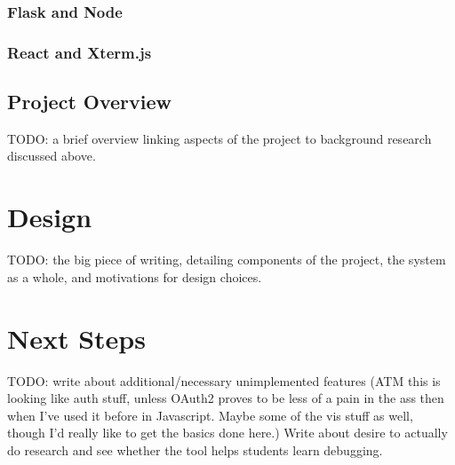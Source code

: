 \documentclass[12pt]{article}
\begin{document}
\subsubsection{Flask and Node}\label{flask/node}

\subsubsection{React and Xterm.js}\label{react}

\subsection{Project Overview}

TODO: a brief overview linking aspects of the project to background
research discussed above.

\section{Design}

TODO: the big piece of writing, detailing components of the project,
the system as a whole, and motivations for design choices.

\section{Next Steps}

TODO: write about additional/necessary unimplemented features (ATM
this is looking like auth stuff, unless OAuth2 proves to be less of a
pain in the ass then when I've used it before in Javascript.  Maybe
some of the vis stuff as well, though I'd really like to get the
basics done here.)  Write about desire to actually do research and see
whether the tool helps students learn debugging.

\pagebreak

{}
\end{document}

